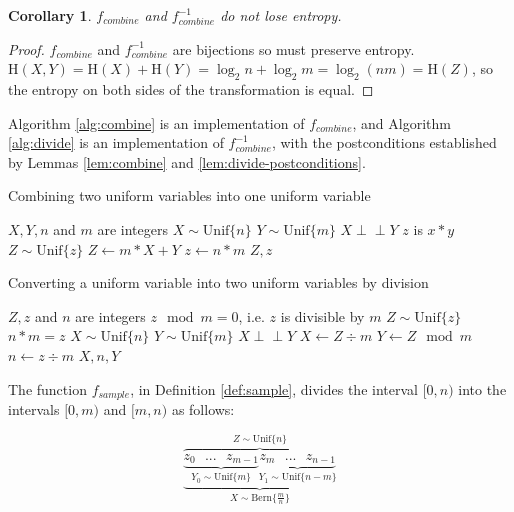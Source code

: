 \documentclass[lettersize,onecolumn]{IEEEtran}
\newtheorem{corollary}{Corollary}
\newcommand{\indep}{\perp\!\!\!\perp}
\newcommand{\unif}[1]{\mathrm{Unif}\{#1\}}
\newcommand{\bern}[1]{\mathrm{Bern}\{#1\}}
\newcommand{\entropy}[1]{\mathrm{H}(#1)}
\begin{document}
\begin{corollary}
    $f_{combine}$ and $f^{-1}_{combine}$ do not lose entropy.
    \label{cor:combine-entropy}
\end{corollary}

\begin{proof}$f_{combine}$ and $f^{-1}_{combine}$ are bijections so must preserve entropy. $\entropy{X,Y} = \entropy{X} + \entropy{Y} = \log_2{n} + \log_2{m} = \log_2(nm) = \entropy{Z}$, so the entropy on both sides of the transformation is equal.
\end{proof}

Algorithm \ref{alg:combine} is an implementation of $f_{combine}$, and Algorithm \ref{alg:divide} is an implementation of $f^{-1}_{combine}$, with the postconditions established by Lemmas \ref{lem:combine} and \ref{lem:divide-postconditions}.

\begin{algorithm}
\caption{Combining two uniform variables into one uniform variable}
\label{alg:combine}
\begin{algorithmic}[1]
    \Require $X, Y, n$ and $m$ are integers
    \Require $X \sim \unif{n}$
    \Require $Y \sim \unif{m}$
    \Require $X \indep Y$
    \Ensure $z$ is $x * y$
    \Ensure $Z \sim \unif{z}$
  \State $Z \gets m * X + Y$
  \State $z \gets n * m$
  \State \Return $Z, z$
\EndProcedure
\end{algorithmic}
\end{algorithm}

\begin{algorithm}
\caption{Converting a uniform variable into two uniform variables by division}
\label{alg:divide}
\begin{algorithmic}[1]
    \Require $Z, z$ and $n$ are integers
    \Require $z \mod m = 0$, i.e. $z$ is divisible by $m$
    \Require $Z \sim \unif{z}$
    \Ensure $n * m = z$
    \Ensure $X \sim \unif{n}$
    \Ensure $Y \sim \unif{m}$
    \Ensure $X \indep Y$
  \State $X \gets Z \div m$
  \State $Y \gets Z \mod m$
  \State $n \gets z \div m$
  \State \Return $X, n, Y$
\EndProcedure
\end{algorithmic}
\end{algorithm}

The function $f_{sample}$, in Definition \ref{def:sample}, divides the interval $[0,n)$ into the intervals $[0,m)$ and $[m, n)$ as follows:

\[
\overbrace{
    \underbrace{
        \underbrace{z_0 \text{   } ... \text{   } z_{m-1}}_{Y_0 \sim \unif{m}}
        \underbrace{z_m \text{   } ... \text{   } z_{n-1}}_{Y_1 \sim \unif{n-m}}}
    }_{X \sim \bern{\frac{m}{n}}}^{Z \sim \unif{n}}
\]
\end{document}
